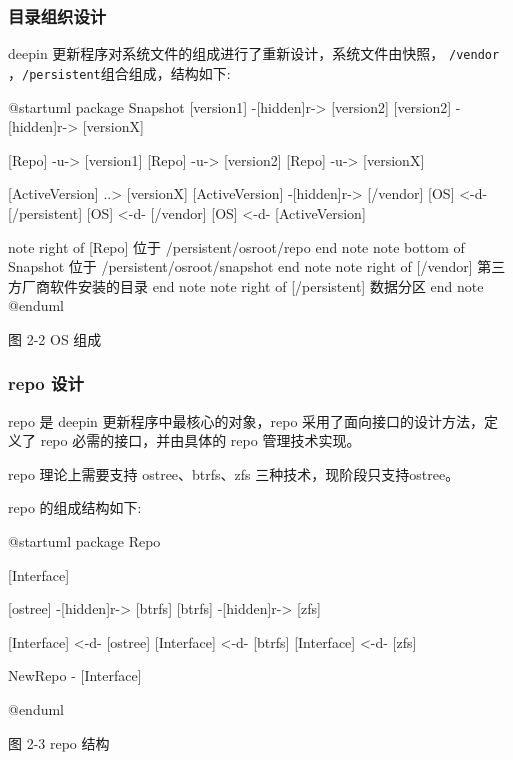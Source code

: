 \documentclass{utart}
\begin{document}
\subsubsection{目录组织设计}

deepin 更新程序对系统文件的组成进行了重新设计，系统文件由快照， \texttt{/vendor} ，\texttt{/persistent}组合组成，结构如下: 
\begin{center}
  \begin{adjustbox}{scale=0.75}
    \begin{plantuml}
    @startuml
    package Snapshot {
      [version1] -[hidden]r-> [version2]
      [version2] -[hidden]r-> [versionX]
    }
    
    [Repo] -u-> [version1]
    [Repo] -u-> [version2]
    [Repo] -u-> [versionX]
    
    [ActiveVersion] ..> [versionX]
    [ActiveVersion] -[hidden]r-> [/vendor]
    [OS] <-d- [/persistent]
    [OS] <-d- [/vendor]
    [OS] <-d- [ActiveVersion]
    
    note right of [Repo]
    位于 /persistent/osroot/repo
    end note
    note bottom of Snapshot
    位于 /persistent/osroot/snapshot
    end note
    note right of [/vendor]
    第三方厂商软件安装的目录
    end note
    note right of [/persistent]
    数据分区
    end note
    @enduml
    \end{plantuml}
  \end{adjustbox}

  图 2-2 OS 组成
\end{center}

\subsubsection{repo 设计}
repo 是 deepin 更新程序中最核心的对象，repo 采用了面向接口的设计方法，定义了 repo 必需的接口，并由具体的 repo 管理技术实现。

repo 理论上需要支持 ostree、btrfs、zfs 三种技术，现阶段只支持ostree。

repo 的组成结构如下: 
\begin{center}
  \begin{adjustbox}{scale=0.55}
    \begin{plantuml}
      @startuml
      package Repo {
        [Interface]

        [ostree] -[hidden]r-> [btrfs]
        [btrfs] -[hidden]r-> [zfs]

        [Interface] <-d- [ostree]
        [Interface] <-d- [btrfs]
        [Interface] <-d- [zfs]

        NewRepo - [Interface]
      }
      @enduml
    \end{plantuml}
  \end{adjustbox}

  图 2-3 repo 结构
\end{center}
\end{document}
